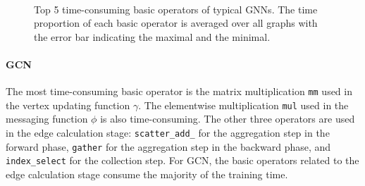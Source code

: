 \begin{figure}
    \centering
    \\
    \caption{Top 5 time-consuming basic operators of typical GNNs. The time proportion of each basic operator is averaged over all graphs with the error bar indicating the maximal and the minimal.}
    \label{fig:exp_top_basic_ops}
\end{figure}

\paragraph{GCN}
The most time-consuming basic operator is the matrix multiplication \texttt{mm} used in the vertex updating function $\gamma$.
The elementwise multiplication \texttt{mul} used in the messaging function $\phi$ is also time-consuming.
The other three operators are used in the edge calculation stage: \texttt{scatter\_add\_} for the aggregation step in the forward phase, \texttt{gather} for the aggregation step in the backward phase, and \texttt{index\_select} for the collection step.
For GCN, the basic operators related to the edge calculation stage consume the majority of the training time.

